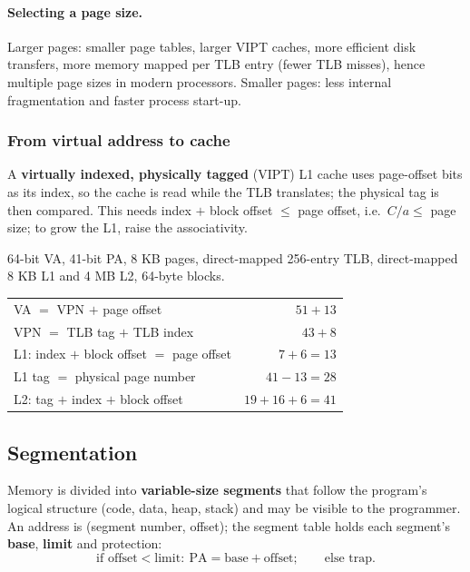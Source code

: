 \paragraph{Selecting a page size.} Larger pages: smaller page tables, larger
VIPT caches, more efficient disk transfers, more memory mapped per TLB entry (fewer
TLB misses), hence multiple page sizes in modern processors. Smaller pages: less
internal fragmentation and faster process start-up.

\subsubsection{From virtual address to cache}
\label{sec:vm-cache}
A \textbf{virtually indexed, physically tagged} (VIPT) L1 cache uses page-offset
bits as its index, so the cache is read while the TLB translates; the physical tag
is then compared. This needs index $+$ block offset $\le$ page offset, i.e.\
$C/a\le$ page size; to grow the L1, raise the associativity.
\begin{eg}
64-bit VA, 41-bit PA, 8 KB pages, direct-mapped 256-entry TLB, direct-mapped 8 KB
L1 and 4 MB L2, 64-byte blocks.
\begin{center}
\small
\begin{tabular}{@{}lr@{}}
\toprule
VA $=$ VPN $+$ page offset & $51+13$ \\
VPN $=$ TLB tag $+$ TLB index & $43+8$ \\
L1: index $+$ block offset $=$ page offset & $7+6=13$ \\
L1 tag $=$ physical page number & $41-13=28$ \\
L2: tag $+$ index $+$ block offset & $19+16+6=41$ \\
\bottomrule
\end{tabular}
\end{center}
\end{eg}

\subsection{Segmentation}
\label{sec:segmentation}

\begin{definition}[Segmentation]
Memory is divided into \textbf{variable-size segments} that follow the program's
logical structure (code, data, heap, stack) and may be visible to the programmer.
An address is (segment number, offset); the segment table holds each segment's
\textbf{base}, \textbf{limit} and protection:
\[
  \text{if offset}<\text{limit}:\ \text{PA}=\text{base}+\text{offset};\qquad
  \text{else trap.}
\]
\end{definition}

